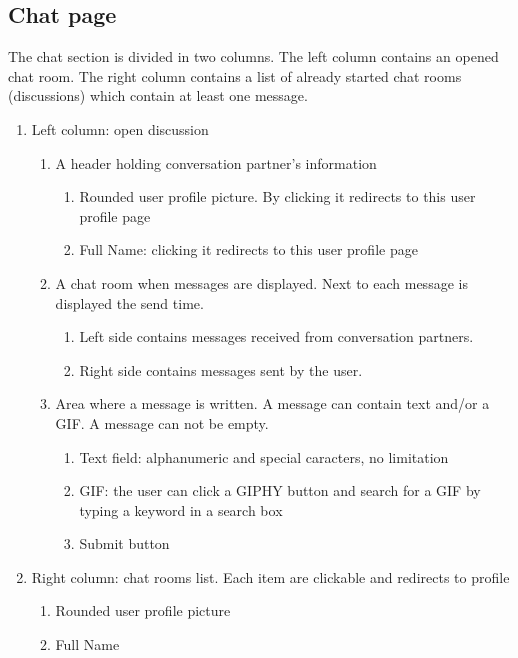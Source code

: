 \documentclass[conference]{IEEEtran}
\begin{document}
\subsection{Chat page}
    The chat section is divided in two columns. The left column contains an opened chat room. The right column contains a list of already started chat rooms (discussions) which contain at least one message.
    \begin{enumerate}
        \item Left column: open discussion
        \begin{enumerate}
            \item A header holding conversation partner's information
            \begin{enumerate}
                \item Rounded user profile picture. By clicking it redirects to this user profile page
                \item Full Name: clicking it redirects to this user profile page
            \end{enumerate}
            \item A chat room when messages are displayed. Next to each message is displayed the send time.
            \begin{enumerate}
                \item Left side contains messages received from conversation partners.
                \item Right side contains messages sent by the user.
            \end{enumerate}
            \item Area where a message is written. A message can contain text and/or a GIF. A message can not be empty.
            \begin{enumerate}
                \item Text field: alphanumeric and special caracters, no limitation
                \item GIF: the user can click a GIPHY button and search for a GIF by typing a keyword in a search box
                \item Submit button
            \end{enumerate}
        \end{enumerate}
        \item Right column: chat rooms list. Each item are clickable and redirects to profile
            \begin{enumerate}
                \item Rounded user profile picture
                \item Full Name
            \end{enumerate}
    \end{enumerate}
\end{document}

